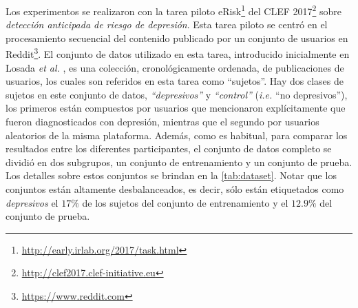 Los experimentos se realizaron con la tarea piloto eRisk\footnote{\url{http://early.irlab.org/2017/task.html}} del CLEF 2017\footnote{\url{http://clef2017.clef-initiative.eu}} sobre \emph{detección anticipada de riesgo de depresión}.
Esta tarea piloto se centró en el procesamiento secuencial del contenido publicado por un conjunto de usuarios en Reddit\footnote{\url{https://www.reddit.com}}.
El conjunto de datos utilizado en esta tarea, introducido inicialmente en Losada \emph{et al.} \cite{losada2016test}, es una colección, cronológicamente ordenada, de publicaciones de usuarios, los cuales son referidos en esta tarea como ``sujetos''.
Hay dos clases de sujetos en este conjunto de datos, \emph{``depresivos''} y \emph{``control''} (\emph{i.e.} ``no depresivos''), los primeros están compuestos por usuarios que mencionaron explícitamente que fueron diagnosticados con depresión, mientras que el segundo por usuarios aleatorios de la misma plataforma.
Además, como es habitual, para comparar los resultados entre los diferentes participantes, el conjunto de datos completo se dividió en dos subgrupos, un conjunto de entrenamiento y un conjunto de prueba.
Los detalles sobre estos conjuntos se brindan en la \autoref{tab:dataset}. Notar que los conjuntos están altamente desbalanceados, es decir, sólo están etiquetados como \emph{depresivos} el $17\%$ de los sujetos del conjunto de entrenamiento y el $12.9\%$ del conjunto de prueba.

